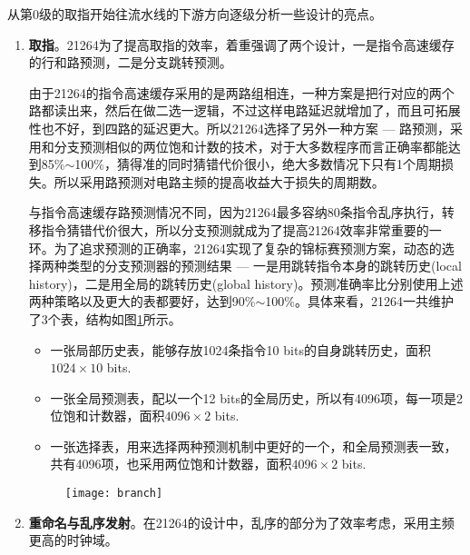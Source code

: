 从第0级的取指开始往流水线的下游方向逐级分析一些设计的亮点。
\begin{enumerate}[label=(\alph*)]
	\item \textbf{取指}。21264为了提高取指的效率，着重强调了两个设计，一是指令高速缓存的行和路预测，二是分支跳转预测。
	
	由于21264的指令高速缓存采用的是两路组相连，一种方案是把行对应的两个路都读出来，然后在做二选一逻辑，不过这样电路延迟就增加了，而且可拓展性也不好，到四路的延迟更大。所以21264选择了另外一种方案 --- 路预测，采用和分支预测相似的两位饱和计数的技术，对于大多数程序而言正确率都能达到85\%$ \sim $100\%，猜得准的同时猜错代价很小，绝大多数情况下只有1个周期\citep{Alpha21264}损失。所以采用路预测对电路主频的提高收益大于损失的周期数。
	
	与指令高速缓存路预测情况不同，因为21264最多容纳80条指令乱序执行，转移指令猜错代价很大，所以分支预测就成为了提高21264效率非常重要的一环。为了追求预测的正确率，21264实现了复杂的锦标赛预测方案，动态的选择两种类型的分支预测器的预测结果 --- 一是用跳转指令本身的跳转历史(local history)，二是用全局的跳转历史(global history)。预测准确率比分别使用上述两种策略以及更大的表都要好，达到90\%$ \sim $100\%\citep{Alpha21264}。具体来看，21264一共维护了3个表，结构如图\ref{fig:branch_21264}所示。
	\begin{itemize}
		\item 一张局部历史表，能够存放1024条指令10 bits的自身跳转历史，面积$ 1024\times 10 $ bits.
		\item 一张全局预测表，配以一个12 bits的全局历史，所以有4096项，每一项是2位饱和计数器，面积$ 4096\times 2 $ bits.
		\item 一张选择表，用来选择两种预测机制中更好的一个，和全局预测表一致，共有4096项，也采用两位饱和计数器，面积$ 4096\times 2 $ bits.
	\end{itemize}
	\begin{figure}[!htbp]
		\centering
		\texttt{[image: branch]}
		\label{fig:branch_21264}
	\end{figure}
	\item \textbf{重命名与乱序发射}。在21264的设计中，乱序的部分为了效率考虑，采用主频更高的时钟域。
	

\end{enumerate}
